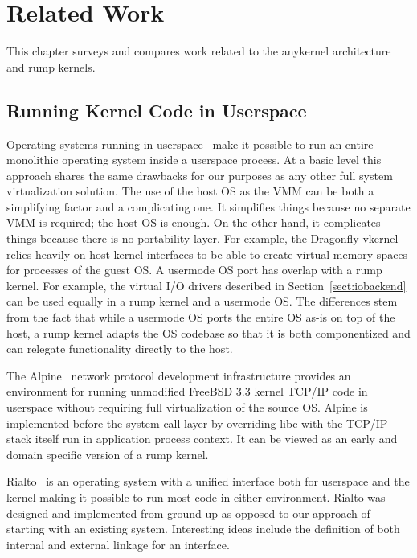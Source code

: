 
\section{Related Work}
\label{chap:related}

This chapter surveys and compares work related to the anykernel
architecture and rump kernels.

\subsection{Running Kernel Code in Userspace}

Operating systems running in userspace~\cite{dike:uml,eco:vkernel}
make it possible to run an entire monolithic operating system inside
a userspace process.  At a basic level this approach shares the
same drawbacks for our purposes as any other full system virtualization
solution.  The use of the host OS as the VMM can be both a simplifying
factor and a complicating one.  It simplifies things because no
separate VMM is required; the host OS is enough.  On the other
hand, it complicates things because there is no portability layer.
For example, the Dragonfly vkernel~\cite{eco:vkernel} relies heavily
on host kernel interfaces to be able to create virtual memory spaces
for processes of the guest OS.  A usermode OS port has overlap with
a rump kernel.  For example, the virtual I/O drivers described in
Section~\ref{sect:iobackend} can be used equally in a rump kernel
and a usermode OS.  The differences stem from the fact that while
a usermode OS ports the entire OS as-is on top of the host, a rump
kernel adapts the OS codebase so that it is both componentized and
can relegate functionality directly to the host.

The Alpine~\cite{ely:alpine} network protocol development infrastructure
provides an environment for running unmodified FreeBSD 3.3 kernel TCP/IP
code in userspace without requiring full virtualization of the source OS.
Alpine is implemented before the system call layer by overriding libc
with the TCP/IP stack itself run in application process context.  It can
be viewed as an early and domain specific version of a rump kernel.

Rialto~\cite{draves:unifying} is an operating system with a unified
interface both for userspace and the kernel making it possible to run
most code in either environment.  Rialto was designed and implemented from
ground-up as opposed to our approach of starting with an existing system.
Interesting ideas include the definition of both internal and external
linkage for an interface.

